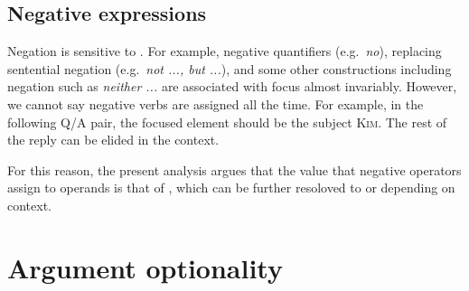 \subsection{Negative expressions}
\label{10:sssec:neg}


Negation is sensitive to  \citep{partee:91,krifka:08}. For example, negative quantifiers
(e.g.\ \textit{no}), replacing sentential negation
(e.g.\ \textit{not ..., but ...}), and some other constructions
including negation such as \textit{neither ...} are associated with
focus almost invariably.  However, we cannot say negative verbs are
assigned  all the time. For example, in the following Q/A
pair, the focused element should be the subject \textsc{Kim}. The rest
of the reply can be elided in the context.


\noindent For this reason, the present analysis argues that the value
that negative operators assign to operands is that of ,
which can be further resoloved to  or  depending on
context.



\section{Argument optionality}
\label{10:sec:arg-opt}

